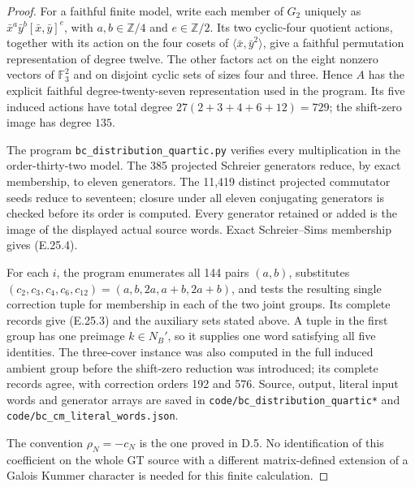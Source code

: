 \begin{proof}
For a faithful finite model, write each member of $G_2$ uniquely
as $\bar x^a\bar y^b[\bar x,\bar y]^e$, with
$a,b\in\mathbb Z/4$ and $e\in\mathbb Z/2$.
Its two cyclic-four quotient actions, together with its action
on the four cosets of $\langle\bar x,\bar y^2\rangle$, give a
faithful permutation representation of degree twelve.
The other factors act on the eight nonzero vectors of
$\mathbb F_3^2$ and on disjoint cyclic sets of sizes four and
three.  Hence $A$ has the explicit faithful degree-twenty-seven
representation used in the program.  Its five induced actions
have total degree $27(2+3+4+6+12)=729$; the shift-zero image
has degree $135$.

The program \texttt{bc\_distribution\_quartic.py} verifies every
multiplication in the order-thirty-two model.  The 385 projected
Schreier generators reduce, by exact membership, to eleven
generators.  The 11,419 distinct projected commutator seeds
reduce to seventeen; closure under all eleven conjugating
generators is checked before its order is computed.  Every
generator retained or added is the image of the displayed
actual source words.  Exact Schreier--Sims membership gives
(E.25.4).

For each $i$, the program enumerates all 144 pairs $(a,b)$,
substitutes $(c_2,c_3,c_4,c_6,c_{12})=(a,b,2a,a+b,2a+b)$,
and tests the resulting single correction tuple for membership
in each of the two joint groups.  Its complete records give
(E.25.3) and the auxiliary sets stated above.  A tuple in the
first group has one preimage $k\in N_B'$, so it supplies one
word satisfying all five identities.  The three-cover instance
was also computed in the full induced ambient group before
the shift-zero reduction was introduced; its complete records
agree, with correction orders 192 and 576.  Source, output,
literal input words and generator arrays are saved in
\texttt{code/bc\_distribution\_quartic*} and
\texttt{code/bc\_cm\_literal\_words.json}.

The convention $\rho_N=-c_N$ is the one proved in D.5.
No identification of this coefficient on the whole GT source
with a different matrix-defined extension of a Galois Kummer
character is needed for this finite calculation.
\end{proof}


